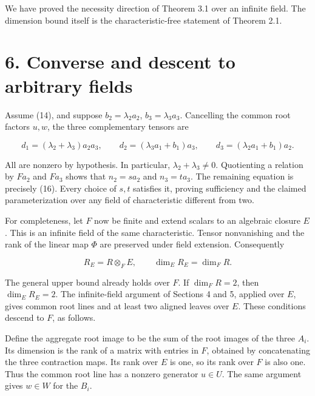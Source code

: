\documentclass[11pt]{article}
\begin{document}
We have proved the necessity direction of Theorem 3.1 over an infinite field. The dimension bound itself is the characteristic-free statement of Theorem 2.1.


\section*{6. Converse and descent to arbitrary fields}

Assume (14), and suppose $b_2=\lambda_2a_2$, $b_3=\lambda_3a_3$. Cancelling the common root factors $u,w$, the three complementary tensors are


\nopagebreak[4]

\begin{equation}
d_1=(\lambda_2+\lambda_3)a_2a_3,\qquad
d_2=(\lambda_3a_1+b_1)a_3,\qquad
d_3=(\lambda_2a_1+b_1)a_2.
\tag{31}
\end{equation}

All are nonzero by hypothesis. In particular, $\lambda_2+\lambda_3\ne0$. Quotienting a relation by $F a_2$ and $F a_3$ shows that $n_2=sa_2$ and $n_3=ta_3$. The remaining equation is precisely (16). Every choice of $s,t$ satisfies it, proving sufficiency and the claimed parameterization over any field of characteristic different from two.


For completeness, let $F$ now be finite and extend scalars to an algebraic closure $E$. This is an infinite field of the same characteristic. Tensor nonvanishing and the rank of the linear map $\Phi$ are preserved under field extension. Consequently


\nopagebreak[4]

\begin{equation}
R_E=R\otimes_F E,\qquad \dim_E R_E=\dim_F R.
\tag{32}
\end{equation}

The general upper bound already holds over $F$. If $\dim_F R=2$, then $\dim_E R_E=2$. The infinite-field argument of Sections 4 and 5, applied over $E$, gives common root lines and at least two aligned leaves over $E$. These conditions descend to $F$, as follows.


Define the aggregate root image to be the sum of the root images of the three $A_i$. Its dimension is the rank of a matrix with entries in $F$, obtained by concatenating the three contraction maps. Its rank over $E$ is one, so its rank over $F$ is also one. Thus the common root line has a nonzero generator $u\in U$. The same argument gives $w\in W$ for the $B_i$.
\end{document}
